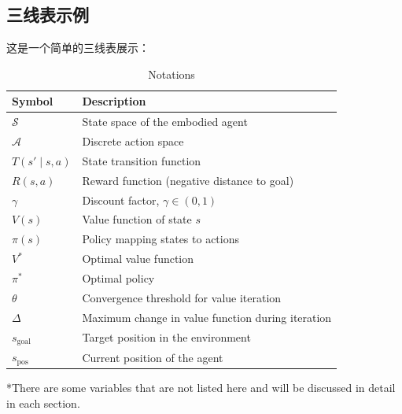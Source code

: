 \subsection{三线表示例}

这是一个简单的三线表展示：

\begin{table}[htbp]
  \begin{center}
    \caption{Notations}
    \begin{tabular}{m{2cm} m{11.6cm}}
      \toprule[2pt]
      \multicolumn{1}{m{2.7cm}}{\centering Symbol}
      & \multicolumn{1}{m{12cm}}{\centering Description} \\
      \midrule
      $\mathcal{S}$ & State space of the embodied agent \\
      \vspace{2pt}
      $\mathcal{A}$ & Discrete action space \\
      \vspace{2pt}
      $T(s' \mid s, a)$ & State transition function \\
      \vspace{2pt}
      $R(s, a)$ & Reward function (negative distance to goal) \\
      \vspace{2pt}
      $\gamma$ & Discount factor, $\gamma \in (0,1)$ \\
      \vspace{2pt}
      $V(s)$ & Value function of state $s$ \\
      \vspace{2pt}
      $\pi(s)$ & Policy mapping states to actions \\
      \vspace{2pt}
      $V^*$ & Optimal value function \\
      \vspace{2pt}
      $\pi^*$ & Optimal policy \\
      \vspace{2pt}
      $\theta$ & Convergence threshold for value iteration \\
      \vspace{2pt}
      $\Delta$ & Maximum change in value function during iteration \\
      \vspace{3pt}
      $s_{\text{goal}}$ & Target position in the environment \\
      \vspace{3pt}
      $s_{\text{pos}}$ & Current position of the agent \\
      
      \bottomrule[2pt]
    \end{tabular}
    \label{tab:notation}
    
    \begin{tablenotes}
      \footnotesize
      \item[*] *There are some variables that are not listed here and will be discussed in detail in each section.
    \end{tablenotes}
  \end{center}
\end{table}


